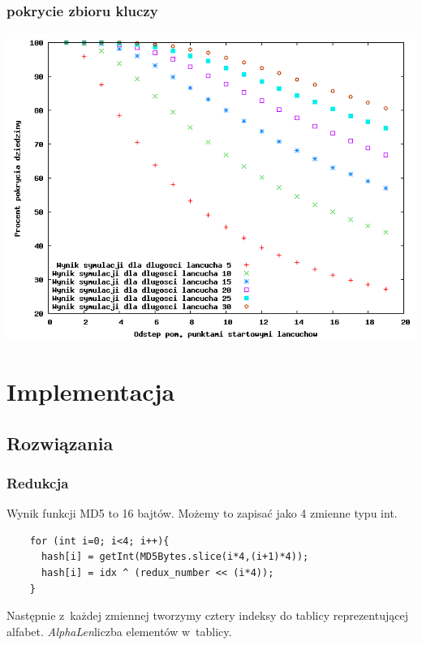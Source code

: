 \documentclass[a4paper]{scrartcl}
\begin{document}
\subsubsection{pokrycie zbioru kluczy}
\includegraphics[width=\textwidth]{pokrycie.png}

\section{Implementacja}
\subsection{Rozwiązania}

\subsubsection{Redukcja}
Wynik funkcji MD5 to 16 bajtów.
Możemy to zapisać jako 4 zmienne typu int.

\begin{lstlisting}
    for (int i=0; i<4; i++){
      hash[i] = getInt(MD5Bytes.slice(i*4,(i+1)*4));
      hash[i] = idx ^ (redux_number << (i*4));
    }
\end{lstlisting}

Następnie z~każdej zmiennej tworzymy cztery indeksy do tablicy reprezentującej alfabet.
\newpage
\emph{AlphaLen}\dywiz liczba elementów w~tablicy.
\end{document}
